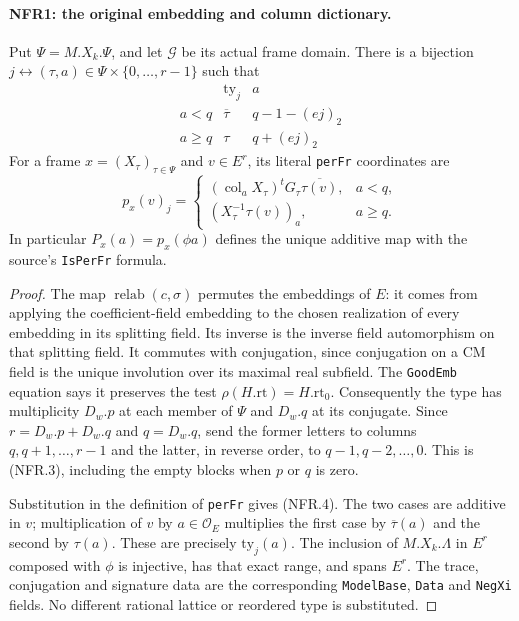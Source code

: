 \paragraph{NFR1: the original embedding and column dictionary.}
\label{claim:NFR1}
Put $\Psi=M.X_k.\Psi$, and let $\mathcal G$ be its actual frame
domain.  There is a bijection
$j\leftrightarrow(\tau,a)\in\Psi\times\{0,\ldots,r-1\}$ such that
\[
\begin{array}{c|c|c}
 &\mathrm{ty}_j& a\\ \hline
 a<q&\overline\tau&q-1-(ej)_2\\
 a\ge q&\tau&q+(ej)_2
\end{array}                                                     \tag{NFR.3}
\]
For a frame $x=(X_\tau)_{\tau\in\Psi}$ and $v\in E^r$, its
literal \texttt{perFr} coordinates are
\[
 p_x(v)_j=
 \begin{cases}
  (\operatorname{col}_aX_\tau)^tG_\tau\overline{\tau(v)},&a<q,\\
  (X_\tau^{-1}\tau(v))_a,&a\ge q.
 \end{cases}                                                    \tag{NFR.4}
\]
In particular $P_x(a)=p_x(\phi a)$ defines the unique additive
map with the source's \texttt{IsPerFr} formula.

\begin{proof}
The map $\operatorname{relab}(c,\sigma)$ permutes the embeddings
of $E$: it comes from applying the coefficient-field embedding to
the chosen realization of every embedding in its splitting field.
Its inverse is the inverse field automorphism on that splitting field.
It commutes with conjugation, since conjugation on a CM field is
the unique involution over its maximal real subfield.  The
\texttt{GoodEmb} equation says it preserves the test
$\rho(H.\mathrm{rt})=H.\mathrm{rt}_0$.
Consequently the type has multiplicity $D_w.p$ at each member of
$\Psi$ and $D_w.q$ at its conjugate.  Since
$r=D_w.p+D_w.q$ and $q=D_w.q$, send the former letters to
columns $q,q+1,\ldots,r-1$ and the latter, in reverse order,
to $q-1,q-2,\ldots,0$.  This is (NFR.3), including the empty
blocks when $p$ or $q$ is zero.

Substitution in the definition of \texttt{perFr} gives (NFR.4).
The two cases are additive in $v$; multiplication of $v$ by
$a\in\mathcal O_E$ multiplies the first case by $\overline\tau(a)$
and the second by $\tau(a)$.  These are precisely $\mathrm{ty}_j(a)$.
The inclusion of $M.X_k.\Lambda$ in $E^r$ composed with $\phi$
is injective, has that exact range, and spans $E^r$.
The trace, conjugation and signature data are the corresponding
\texttt{ModelBase}, \texttt{Data} and \texttt{NegXi} fields.
No different rational lattice or reordered type is substituted.
\end{proof}

